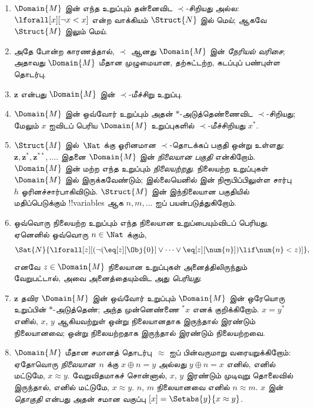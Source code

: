 \documentclass[11pt,a4paper,openany]{memoir}
\begin{document}
\begin{enumerate}
\item $\Domain{M}$ இன் எந்த உறுப்பும் தன்னைவிட
  $\prec$-சிறியது அல்ல: $\lforall[x][\lnot x < x]$
  என்ற வாக்கியம் $\Struct{N}$ இல் மெய்; ஆகவே
  $\Struct{M}$ இலும் மெய்.
\item அதே போன்ற காரணத்தால், $\prec$ ஆனது
  $\Domain{M}$ இன் \emph{நேரியல் வரிசை}; அதாவது
  $\Domain{M}$ மீதான முழுமையான, தற்சுட்டற்ற,
  கடப்புப் பண்புள்ள தொடர்பு.
\item $\mathbf{z}$ என்பது $\Domain{M}$ இன்
  $\prec$-மீச்சிறு உறுப்பு.
\item $\Domain{M}$ இன் ஒவ்வோர் உறுப்பும் அதன்
  $*$-அடுத்தெண்ணைவிட $\prec$-சிறியது; மேலும்
  $x$ ஐவிடப் பெரிய $\Domain{M}$ உறுப்புகளில்
  $\prec$-மீச்சிறியது $x^*$.

\item $\Struct{M}$ இல்~$\Nat$ க்கு ஓரினமான
  $\prec$-தொடக்கப் பகுதி ஒன்று உள்ளது:
  $\mathbf{z}, \mathbf{z}^*, \mathbf{z}^{**}, \dots$.
  இதனை $\Domain{M}$ இன் \emph{நிலையான பகுதி}
  என்கிறோம். $\Domain{M}$ இன் மற்ற எந்த உறுப்பும்
  \emph{நிலையற்றது}. நிலையற்ற உறுப்புகள்
  $\Domain{M}$ இல் இருக்கவேண்டும்; இல்லையெனில்
   இன் நிரூபிப்பிலுள்ள சார்பு~$h$
  ஓரினச்சார்பாகிவிடும். $\Struct{M}$ இன் இந்நிலையான
  பகுதியில் மதிப்பெடுக்கும் !!{variable}s ஆக
  $n, m, \dots$ ஐப் பயன்படுத்துகிறோம்.
\item ஒவ்வொரு நிலையற்ற உறுப்பும் எந்த நிலையான
  உறுப்பையும்விடப் பெரியது. ஏனெனில்
  ஒவ்வொரு $n \in \Nat$ க்கும்,
  \[
  \Sat{N}{\lforall[z][(\lnot(\eq[z][\Obj{0}] \lor
  \dots \lor \eq[z][\num{n}]) \lif \num{n} < z)]},
  \]
  எனவே $z \in \Domain{M}$ நிலையான உறுப்புகள்
  அனைத்திலிருந்தும் வேறுபட்டால், அவை அனைத்தையும்விட
  அது \emph{பெரியது}.
\item $\mathbf{z}$ தவிர $\Domain{M}$ இன் ஒவ்வோர்
  உறுப்பும் $\Domain{M}$ இன் ஒரேயொரு உறுப்பின்
  $*$-அடுத்தெண்; அந்த முன்னெண்ணை $^*x$
  எனக் குறிக்கிறோம். $x = y^*$ எனில், $x$, $y$
  ஆகியவற்றுள் ஒன்று நிலையானதாக இருந்தால் இரண்டும்
  நிலையானவை; ஒன்று நிலையற்றதாக இருந்தால் இரண்டும்
  நிலையற்றவை.

\item $\Domain{M}$ மீதான சமானத் தொடர்பு~$\approx$
  ஐப் பின்வருமாறு வரையறுக்கிறோம்: ஏதோவொரு
  \emph{நிலையான}~$n$ க்கு
  $x \oplus n = y$ அல்லது $y \oplus n =x$
  எனில், எனில் மட்டுமே, $x \approx y$.
  வேறுவிதமாகச் சொன்னால், $x$, $y$ இரண்டும்
  முடிவுறு தொலைவில் இருந்தால், எனில் மட்டுமே,
  $x \approx y$. $n$, $m$ நிலையானவை எனில்
  $n \approx m$. $x$ இன் \emph{தொகுதி}
  என்பது அதன் சமான வகுப்பு
  $[x] = \Setabs{y}{x
  \approx y}$.


\end{enumerate}
\end{document}
